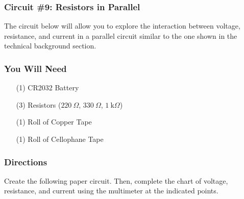     \subsubsection*{Circuit \#9: Resistors in Parallel}
    The circuit below will allow you to explore the interaction between voltage, resistance, and current in a parallel circuit similar to the one shown in the technical background section.

    \subsubsection*{You Will Need}
    \begin{itemize}[noitemsep]
        \item[(1)] CR2032 Battery
        \item[(3)] Resistors ($220\ \Omega$, $330\ \Omega$, $1\ \text{k}\Omega$)
        \item[(1)] Roll of Copper Tape
        \item[(1)] Roll of Cellophane Tape   
    \end{itemize}
    
    \subsubsection*{Directions}
    Create the following paper circuit. Then, complete the chart of voltage, resistance, and current using the multimeter at the indicated points.

